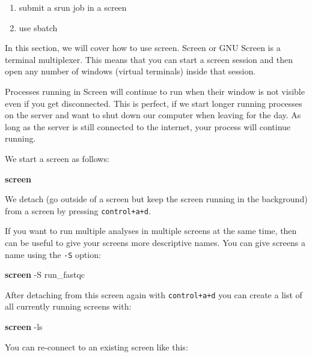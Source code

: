 \documentclass[
  letterpaper,
  DIV=11,
  numbers=noendperiod]{scrreprt}
\newenvironment{Shaded}{}{}
\newcommand{\AttributeTok}[1]{\textcolor[rgb]{0.84,0.23,0.29}{#1}}
\newcommand{\ExtensionTok}[1]{\textcolor[rgb]{0.84,0.23,0.29}{\textbf{#1}}}
\newcommand{\NormalTok}[1]{\textcolor[rgb]{0.14,0.16,0.18}{#1}}
\providecommand{\tightlist}{%
  \setlength{\itemsep}{0pt}\setlength{\parskip}{0pt}}\usepackage{longtable,booktabs,array}
\begin{document}
\begin{enumerate}
\def\labelenumi{\arabic{enumi}.}
\tightlist
\item
  submit a srun job in a screen
\item
  use sbatch
\end{enumerate}

In this section, we will cover how to use screen. Screen or GNU Screen
is a terminal multiplexer. This means that you can start a screen
session and then open any number of windows (virtual terminals) inside
that session.

Processes running in Screen will continue to run when their window is
not visible even if you get disconnected. This is perfect, if we start
longer running processes on the server and want to shut down our
computer when leaving for the day. As long as the server is still
connected to the internet, your process will continue running.

We start a screen as follows:

\begin{Shaded}
\begin{Highlighting}[]
\ExtensionTok{screen}
\end{Highlighting}
\end{Shaded}

We detach (go outside of a screen but keep the screen running in the
background) from a screen by pressing \texttt{control+a+d}.

If you want to run multiple analyses in multiple screens at the same
time, then can be useful to give your screens more descriptive names.
You can give screens a name using the \texttt{-S} option:

\begin{Shaded}
\begin{Highlighting}[]
\ExtensionTok{screen} \AttributeTok{{-}S}\NormalTok{ run\_fastqc}
\end{Highlighting}
\end{Shaded}

After detaching from this screen again with \texttt{control+a+d} you can
create a list of all currently running screens with:

\begin{Shaded}
\begin{Highlighting}[]
\ExtensionTok{screen} \AttributeTok{{-}ls}
\end{Highlighting}
\end{Shaded}

You can re-connect to an existing screen like this:
\end{document}
